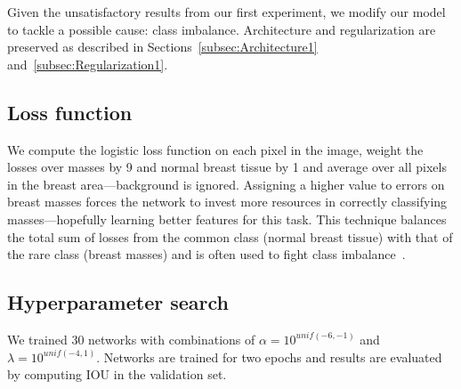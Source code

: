 Given the unsatisfactory results from our first experiment, we modify our model to tackle a possible cause: class imbalance. Architecture and regularization are preserved as described in Sections~\ref{subsec:Architecture1} and~\ref{subsec:Regularization1}.

\subsection{Loss function}
We compute the logistic loss function on each pixel in the image, weight the losses over masses by 9 and normal breast tissue by 1 and average over all pixels in the breast area---background is ignored. Assigning a higher value to errors on breast masses forces the network to invest more resources in correctly classifying masses---hopefully learning better features for this task.
This technique balances the total sum of losses from the common class (normal breast tissue) with that of the rare class (breast masses) and is often used to fight class imbalance~\cite{Provost2000}.

\subsection{Hyperparameter search}
We trained 30 networks with combinations of $\alpha = 10^{unif(-6, -1)}$ and $\lambda = 10^{unif(-4, 1)}$. Networks are trained for two epochs and results are evaluated by computing IOU in the validation set.

